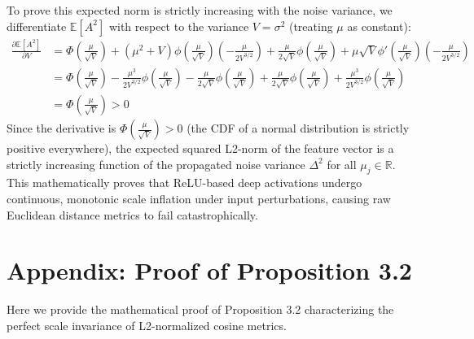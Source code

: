 \documentclass{article}
\theoremstyle{plain}
\theoremstyle{definition}
\theoremstyle{remark}
\begin{document}
To prove this expected norm is strictly increasing with the noise variance, we differentiate $\mathbb{E}[A^2]$ with respect to the variance $V = \sigma^2$ (treating $\mu$ as constant):
\begin{align}
\frac{\partial \mathbb{E}[A^2]}{\partial V} &= \Phi\left(\frac{\mu}{\sqrt{V}}\right) + (\mu^2 + V)\phi\left(\frac{\mu}{\sqrt{V}}\right)\left(-\frac{\mu}{2V^{3/2}}\right) + \frac{\mu}{2\sqrt{V}}\phi\left(\frac{\mu}{\sqrt{V}}\right) + \mu\sqrt{V}\phi'\left(\frac{\mu}{\sqrt{V}}\right)\left(-\frac{\mu}{2V^{3/2}}\right) \nonumber \\
&= \Phi\left(\frac{\mu}{\sqrt{V}}\right) - \frac{\mu^3}{2V^{3/2}}\phi\left(\frac{\mu}{\sqrt{V}}\right) - \frac{\mu}{2\sqrt{V}}\phi\left(\frac{\mu}{\sqrt{V}}\right) + \frac{\mu}{2\sqrt{V}}\phi\left(\frac{\mu}{\sqrt{V}}\right) + \frac{\mu^3}{2V^{3/2}}\phi\left(\frac{\mu}{\sqrt{V}}\right) \nonumber \\
&= \Phi\left(\frac{\mu}{\sqrt{V}}\right) > 0
\end{align}
Since the derivative is $\Phi\left(\frac{\mu}{\sqrt{V}}\right) > 0$ (the CDF of a normal distribution is strictly positive everywhere), the expected squared L2-norm of the feature vector is a strictly increasing function of the propagated noise variance $\Delta^2$ for all $\mu_j \in \mathbb{R}$. This mathematically proves that ReLU-based deep activations undergo continuous, monotonic scale inflation under input perturbations, causing raw Euclidean distance metrics to fail catastrophically.

\section*{Appendix: Proof of Proposition 3.2}
Here we provide the mathematical proof of Proposition 3.2 characterizing the perfect scale invariance of L2-normalized cosine metrics.
\end{document}
